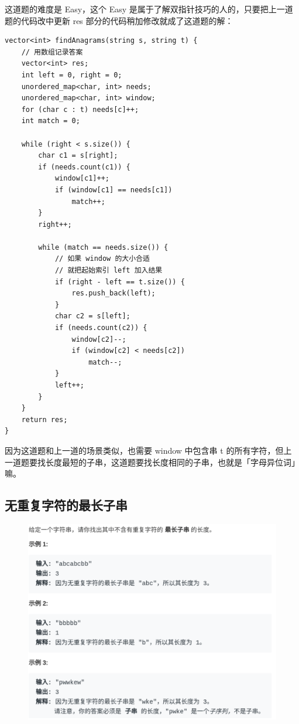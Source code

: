 \documentclass[12pt]{article}
\begin{document}
这道题的难度是 Easy，这个 Easy 是属于了解双指针技巧的人的，只要把上一道题的代码改中更新 res 部分的代码稍加修改就成了这道题的解：
\begin{lstlisting}
vector<int> findAnagrams(string s, string t) {
    // 用数组记录答案
    vector<int> res;
    int left = 0, right = 0;
    unordered_map<char, int> needs;
    unordered_map<char, int> window;
    for (char c : t) needs[c]++;
    int match = 0;
    
    while (right < s.size()) {
        char c1 = s[right];
        if (needs.count(c1)) {
            window[c1]++;
            if (window[c1] == needs[c1])
                match++;
        }
        right++;

        while (match == needs.size()) {
            // 如果 window 的大小合适
            // 就把起始索引 left 加入结果
            if (right - left == t.size()) {
                res.push_back(left);
            }
            char c2 = s[left];
            if (needs.count(c2)) {
                window[c2]--;
                if (window[c2] < needs[c2])
                    match--;
            }
            left++;
        }
    }
    return res;
}
\end{lstlisting}

因为这道题和上一道的场景类似，也需要 window 中包含串 t 的所有字符，但上一道题要找长度最短的子串，这道题要找长度相同的子串，也就是「字母异位词」嘛。

\subsection{无重复字符的最长子串}
\begin{figure}[H]
    \centering
    \includegraphics[width=.8\textwidth]{fig/Sliding_Window_7.png}
\end{figure}
\end{document}
